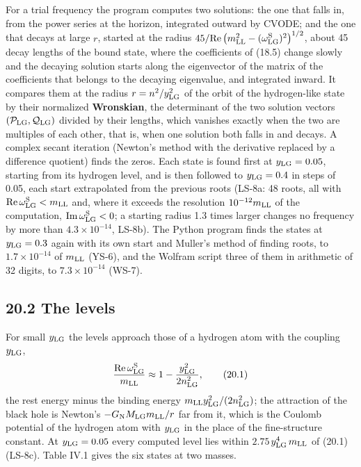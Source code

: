 \documentclass[
  10pt,
]{article}
\begin{document}
For a trial frequency the program computes two solutions: the one that
falls in, from the power series at the horizon, integrated outward by
CVODE; and the one that decays at large \(r\), started at the radius
\(45/{\rm Re}\,\big(m_{\rm LL}^2-(\omega^{\rm S}_{\rm LG})^2\big)^{1/2}\),
about 45 decay lengths of the bound state, where the coefficients of
(18.5) change slowly and the decaying solution starts along the
eigenvector of the matrix of the coefficients that belongs to the
decaying eigenvalue, and integrated inward. It compares them at the
radius \(r=n^2/y_{\rm LG}^2\) of the orbit of the hydrogen-like state by
their normalized \textbf{Wronskian}, the determinant of the two solution
vectors \((\mathcal P_{\rm LG},\mathcal Q_{\rm LG})\) divided by their
lengths, which vanishes exactly when the two are multiples of each
other, that is, when one solution both falls in and decays. A complex
secant iteration (Newton's method with the derivative replaced by a
difference quotient) finds the zeros. Each state is found first at
\(y_{\rm LG}=0.05\), starting from its hydrogen level, and is then
followed to \(y_{\rm LG}=0.4\) in steps of 0.05, each start extrapolated
from the previous roots (LS-8a: 48 roots, all with
\({\rm Re}\,\omega^{\rm S}_{\rm LG}<m_{\rm LL}\) and, where it exceeds
the resolution \(10^{-12}m_{\rm LL}\) of the computation,
\({\rm Im}\,\omega^{\rm S}_{\rm LG}<0\); a starting radius 1.3 times
larger changes no frequency by more than \(4.3\times10^{-14}\), LS-8b).
The Python program finds the states at \(y_{\rm LG}=0.3\) again with its
own start and Muller's method of finding roots, to \(1.7\times10^{-14}\)
of \(m_{\rm LL}\) (YS-6), and the Wolfram script three of them in
arithmetic of 32 digits, to \(7.3\times10^{-14}\) (WS-7).

\hypertarget{the-levels}{%
\subsection{20.2 The levels}\label{the-levels}}

For small \(y_{\rm LG}\) the levels approach those of a hydrogen atom
with the coupling \(y_{\rm LG}\),
\[\frac{{\rm Re}\,\omega^{\rm S}_{\rm LG}}{m_{\rm LL}}\approx1-\frac{y_{\rm LG}^2}{2n_{\rm LG}^2},\tag{20.1}\]
the rest energy minus the binding energy
\(m_{\rm LL}y_{\rm LG}^2/(2n_{\rm LG}^2)\); the attraction of the black
hole is Newton's \(-G_{\rm N}M_{\rm LG}m_{\rm LL}/r\) far from it, which
is the Coulomb potential of the hydrogen atom with \(y_{\rm LG}\) in the
place of the fine-structure constant. At \(y_{\rm LG}=0.05\) every
computed level lies within \(2.75\)\(\,y_{\rm LG}^4\,m_{\rm LL}\) of
(20.1) (LS-8c). Table IV.1 gives the six states at two masses.
\end{document}

